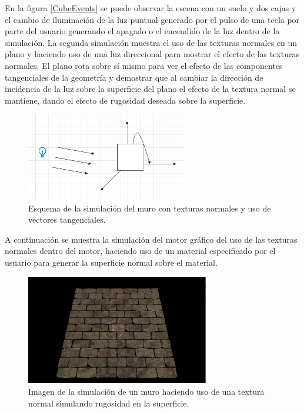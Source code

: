\documentclass[a4paper]{book}
\begin{document}
En la figura \ref{CubeEvents} se puede observar la escena con un suelo y dos cajas y el cambio de iluminación de la luz puntual generado por
el pulso de una tecla por parte del usuario generando el apagado o el encendido de la luz dentro de la simulación. La segunda simulación
muestra el uso de las texturas normales en un plano y haciendo uso de una luz direccional para mostrar el efecto de las texturas normales.
El plano rota sobre sí mismo para ver el efecto de las componentes tangenciales de la geometría y demostrar que al cambiar la dirección
de incidencia de la luz sobre la superficie del plano el efecto de la textura normal se mantiene, dando el efecto de rugosidad deseada
sobre la superficie.

\begin{figure}[H]
    \centering
    \includegraphics[width=7cm, keepaspectratio]{img/WallDiagram.png}
    \caption{Esquema de la simulación del muro con texturas normales y uso de vectores tangenciales.}
    \label{WallDiagram}
\end{figure}

A continuación se muestra la simulación del motor gráfico del uso de las texturas normales dentro del motor, haciendo uso de un
material especificado por el usuario para generar la superficie normal sobre el material.

\begin{figure}[H]
    \centering
    \includegraphics[width=8cm, keepaspectratio]{img/WallResult.png}
    \caption{Imagen de la simulación de un muro haciendo uso de una textura normal simulando rugosidad en la superficie.}
    \label{WallResult}
\end{figure}
\end{document}
